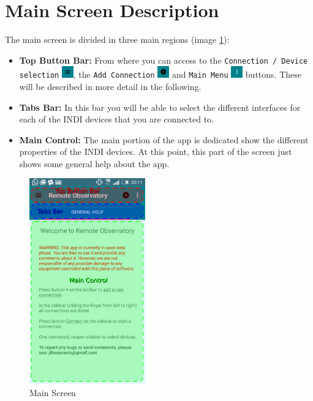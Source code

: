             

\section{Main Screen Description}

The main screen is divided in three main regions (image \ref{fig:mainScreen}):

\begin{itemize}
  \item \textbf{Top Button Bar:} From where you can access to the \texttt{Connection / Device selection}  \includegraphics[width=0.5cm]{../images/connectionDeviceSelectionButton.png}, the \texttt{Add Connection}  \includegraphics[width=0.5cm]{../images/addConnectionButton.png} and \texttt{Main Menu} \includegraphics[width=0.5cm]{../images/mainMenuButton.png} buttons. These will be described in more detail in the following.
  \item \textbf{Tabs Bar:} In this bar you will be able to select the different interfaces for each of the INDI devices that you are connected to.
  \item \textbf{Main Control:} The main portion of the app is dedicated show the different properties of the INDI devices. At this point, this part of the screen just shows some general help about the app.
\end{itemize}


\begin{figure}
 \centering
 \includegraphics[width=5cm]{../images/mainScreen2.jpg}
 \caption{Main Screen}
 \label{fig:mainScreen}
\end{figure}


